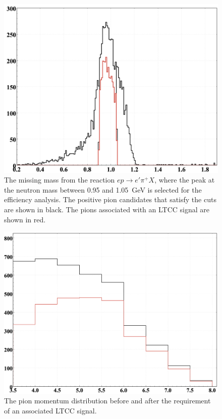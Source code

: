 \begin{figure}
	\centering
	\includegraphics[width=0.98\columnwidth,keepaspectratio]{img/detFiducialCut.png}
	\caption{The missing mass from the reaction $ep \to e'\pi^+X$, where the peak at the neutron mass
          between 0.95 and 1.05~GeV is selected for the efficiency analysis. The positive pion candidates that
          satisfy the cuts are shown in black. The pions associated with an LTCC signal are shown in red.}
	\label{fig:neutronMM}
\end{figure}

\begin{figure}
	\centering
	\includegraphics[width=0.98\columnwidth,keepaspectratio]{img/pionMomentum.png}
	\caption{The pion momentum distribution before and after the requirement of an associated LTCC signal. }
	\label{fig:pionMomentum}
\end{figure}

